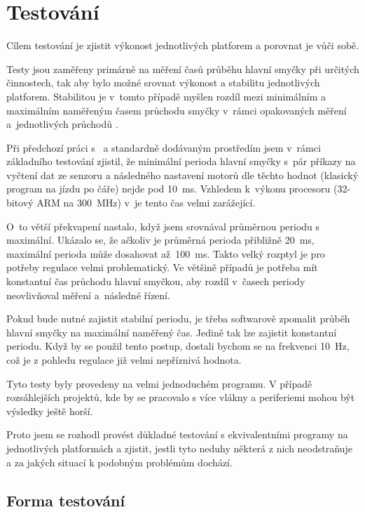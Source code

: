 \chapter{Testování}

Cílem testování je zjistit výkonost jednotlivých platforem a porovnat je vůči sobě. 

Testy jsou zaměřeny primárně na měření časů průběhu hlavní smyčky při určitých činnostech, tak aby bylo možné srovnat výkonost a stabilitu jednotlivých platforem. 
Stabilitou je v~tomto případě myšlen rozdíl mezi minimálním a maximálním naměřeným časem průchodu smyčky v~rámci opakovaných měření a~jednotlivých průchodů .

Při předchozí práci s~\EVthree{ } a standardně dodávaným prostředím jsem v~rámci základního testování zjistil, že minimální perioda hlavní smyčky s~pár příkazy na vyčtení dat ze senzoru a následného nastavení motorů dle těchto hodnot (klasický program na jízdu po čáře) nejde pod 10~ms. 
Vzhledem k~výkonu procesoru (32-bitový ARM na 300~MHz) v~\EVthree{ }je tento čas velmi zarážející. 

O~to větší překvapení nastalo, když jsem srovnával průměrnou periodu s maximální. Ukázalo se, že ačkoliv je průměrná perioda přibližně 20~ms, maximální perioda může dosahovat až~100~ms. 
Takto velký rozptyl je pro potřeby regulace velmi problematický. 
Ve většině případů je potřeba mít konstantní čas průchodu hlavní smyčkou, aby rozdíl v~časech periody neovlivňoval měření a~následné řízení. 

Pokud bude nutné zajistit stabilní periodu, je třeba softwarově zpomalit průběh hlavní smyčky na maximální naměřený čas. 
Jedině tak lze zajistit konstantní periodu. 
Když by se použil tento postup, dostali bychom se na frekvenci 10~Hz, což je z pohledu regulace již velmi nepříznivá hodnota.

Tyto testy byly provedeny na velmi jednoduchém programu. 
V případě rozsáhlejších projektů, kde by se pracovalo s více vlákny a periferiemi mohou být výsledky ještě horší.

Proto jsem se rozhodl provést důkladné testování s ekvivalentními programy na jednotlivých platformách a zjistit, jestli tyto neduhy některá z nich neodstraňuje a za jakých situací k podobným problémům dochází.

\section{Forma testování}

